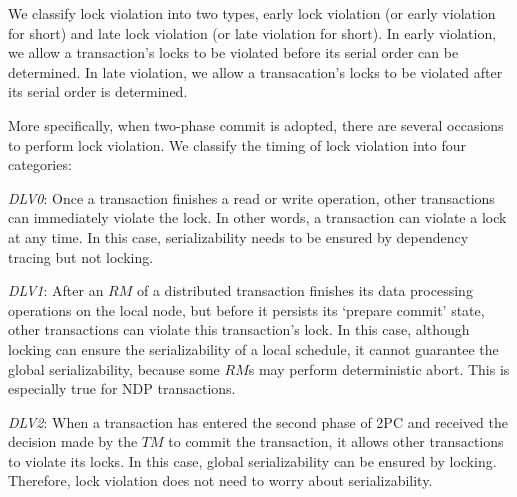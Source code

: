 \documentclass[conference]{IEEEtran}
\begin{document}
We classify lock violation into two types, early lock violation (or early violation for short) and late lock violation (or late violation for short).
In early violation,  we allow a transaction's locks to be violated before its serial order can be determined.
In late violation,  we allow a transacation's locks to be violated after its serial order is determined.


More specifically, when two-phase commit is adopted, there are several occasions to perform lock violation.
We classify the timing of lock violation into four categories:

\emph{DLV0}:
Once a transaction finishes a read or write operation, other transactions can immediately violate the lock.
In other words, a transaction can violate a lock at any time.
In this case, serializability needs to be ensured by dependency tracing but not locking.

\emph{DLV1}:
After an ${RM}$ of a distributed transaction finishes its data processing operations on the local node, but before it persists its `prepare commit' state, other transactions can violate this transaction's lock.
In this case, although locking can ensure the serializability of a local schedule, it cannot guarantee the global serializability, because some ${RM}$s may perform deterministic abort.
This is especially true for NDP transactions.

\emph{DLV2}:
When a transaction has entered the second phase of 2PC and received the decision made by the ${TM}$ to commit the transaction, it allows other transactions to violate its locks.
In this case, global serializability can be ensured by locking. Therefore, lock violation does not need to worry about serializability.
\end{document}

